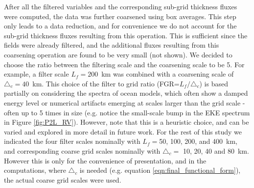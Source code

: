 \documentclass[draft]{agujournal2019}
\begin{document}
After all the filtered variables and the corresponding sub-grid thickness fluxes were computed, the data was further coarsened using box averages. This step only leads to a data reduction, and for convenience we do not account for the sub-grid thickness fluxes resulting from this operation. This is sufficient since the fields were already filtered, and the additional fluxes resulting from this coarsening operation are found to be very small (not shown). We decided to choose the ratio between the filtering scale and the coarsening scale to be 5. For example, a filter scale $L_f =200$~km was combined with a coarsening scale of $\triangle_c =40$~km. This choice of the filter to grid ratio (FGR=$L_f/\triangle_c$) is based partially on considering the spectra of ocean models, which often show a damped energy level or numerical artifacts emerging at scales larger than the grid scale - often up to 5 times in size (e.g. notice the small-scale bump in the EKE spectrum in Figure \ref{fig:P2L_RV}). However, note that this is a heuristic choice, and can be varied and explored in more detail in future work. For the rest of this study we indicated the four filter scales nominally with $L_f=$50, 100, 200, and 400~km, and corresponding coarse grid scales nominally with $\triangle_c=$ 10, 20, 40 and 80~km. However this is only for the convenience of presentation, and in the computations, where $\triangle_c$ is needed (e.g. equation \ref{eqn:final_functional_form}), the actual coarse grid scales were used. 
\end{document}
